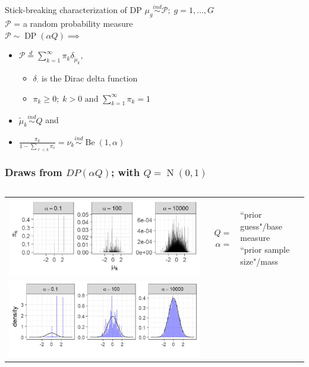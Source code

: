 \documentclass{beamer}
\newcommand{\op}{\operatorname}
\newcommand{\ind}{\stackrel{ind}{\sim}}
\begin{document}
\begin{frame}%
  \centering
    \begin{beamerboxesrounded}[upper=upcol,lower=lowcol,shadow=true]{Stick-breaking characterization of DP}
      \pause $\mu_g \ind \mathcal{P};\; g=1,\ldots,G$\\
      \pause $\mathcal{P}$ = a random probability measure\\
      \pause $\mathcal{P} \sim \op{DP}(\alpha Q) \implies$
      \begin{itemize}
        \pause \item $\mathcal{P} \stackrel{d}{=} \sum_{k=1}^\infty \pi_k \delta_{\tilde{\mu}_k},\;$
        \begin{itemize}
          \pause \item $\delta_{\cdot}$ is the Dirac delta function
          \pause \item $\pi_k \ge 0;\;k>0 \mbox{ and }\sum_{k=1}^\infty \pi_k=1$
        \end{itemize}
        \pause \item $\tilde{\mu}_k \ind Q$ \pause and
        \pause \item $\frac{\pi_k}{1-\sum_{\ell<k} \pi_\ell}=\nu_k \ind \op{Be}(1,\alpha)$
      \end{itemize}
      \citep{sethuraman}
    \end{beamerboxesrounded}
\end{frame}

\begin{frame}%
  \frametitle{Draws from $DP(\alpha Q)$; with $Q=\op{N}(0,1)$}
  \begin{columns}
    \column{\dimexpr\paperwidth-10pt}
    \begin{table}
      \centering
      \tiny
      \begin{tabular}{crl}
        \includegraphics[height=.25\textwidth]{dp1}& \multirowcell{2}{ $Q=$\\$\alpha =$} & \multirowcell{2}{ ``prior guess"/base measure \\ ``prior sample size"/mass}\\
        \pause\includegraphics[height=.25\textwidth]{dp2}&&\\
      \end{tabular}
    \end{table}
  \end{columns}
\end{frame}
\end{document}
